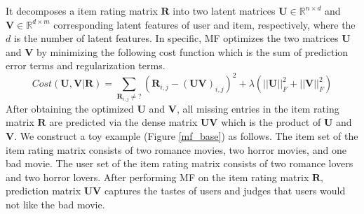 \documentclass[master,english,final]{kaist-ucs}
\begin{document}
It decomposes a item rating matrix $\bm{R}$ into two latent matrices $\bm{U} \in \mathbb{R}^{n \times d}$ and $\bm{V} \in \mathbb{R}^{d \times m}$ corresponding latent features of user and item, respectively, where the $d$ is the number of latent features.
In specific, MF optimizes the two matrices $\bm{U}$ and $\bm{V}$ by minimizing the following cost function which is the sum of prediction error terms and regularization terms.
\begin{equation}
Cost(\bm{U},\bm{V} | \bm{R})=\sum_{\bm{R}_{i,j} \neq ?} (  \bm{R}_{i,j} - (\bm{UV})_{i,j} )^2 + \lambda(||\bm{U}||_F^2+||\bm{V}||_F^2)
\end{equation}
After obtaining the optimized $\bm{U}$ and $\bm{V}$, all missing entries in the item rating matrix $\bm{R}$ are predicted via the dense matrix $\bm{UV}$ which is the product of $\bm{U}$ and $\bm{V}$.
We construct a toy example (Figure \ref{mf_base}) as follows.
The item set of the item rating matrix consists of two romance movies, two horror movies, and one bad movie.
The user set of the item rating matrix consists of two romance lovers and two horror lovers.
After performing MF on the item rating matrix $\bm{R}$, prediction matrix $\bm{UV}$ captures the tastes of users and judges that users would not like the bad movie.
\end{document}
